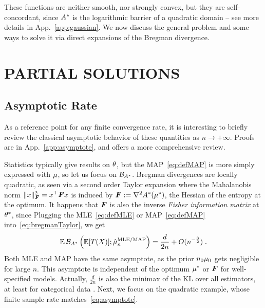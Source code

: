 These functions are neither smooth, nor strongly convex, but they are self-concordant, since ${A^*}$ is  the logarithmic barrier of a quadratic domain
-- see more details in App.~\ref{app:gaussian}.
We now discuss the general problem and some ways to solve it via direct expansions of the Bregman divergence.

\section{PARTIAL SOLUTIONS}
\label{sec:insights}

\subsection{Asymptotic Rate}
\label{ssec:asymptote}
As a reference point for any finite convergence rate, it is interesting to briefly review the classical asymptotic behavior of these quantities as $n \rightarrow +\infty$.
Proofs are in App.~\ref{app:asymptote}, and \citet[\S1.1]{ostrovskii2021finite} offers a more comprehensive review.

Statistics typically give results on $\theta$, but the MAP~\eqref{eq:defMAP} is more simply expressed with $\mu$, so let us focus on ${\mathcal B}_{A^*}$.
Bregman divergences are locally quadratic, as seen via a second order Taylor expansion
where the Mahalanobis norm  $\| x \|_{{\bm{F}}}^2 = x^\top {\bm{F}} x$  is induced by ${\bm{F}}  := \nabla^2{A^*}(\mu^*)$, the Hessian of the entropy at the optimum. It happens that  ${\bm{F}}$ is also the inverse \textit{Fisher information matrix} at $\theta^*$, since
Plugging the MLE~\eqref{eq:defMLE} or MAP~\eqref{eq:defMAP} into~\eqref{eq:bregmanTaylor}, we get
\begin{align}
	\label{eq:asymptote}
	\operatorname{\mathbb{E}} {\mathcal B}_{A^*} \left (\operatorname{\mathbb{E}} [T(X)] ; \hat {\mu}_n^\text{MLE/MAP} \right )
	= \frac{d}{2n} + O(n^{- \frac{3}{2}}) \; .
\end{align}
Both MLE and MAP have the same asymptote, as the prior $n_0 \mu_0$ gets negligible for large $n$.
This asymptote is independent of the optimum $\mu^*$ or ${\bm{F}}$ for well-specified models.
Actually, $\frac{d}{2n}$ is also the minimax of the KL over all estimators, at least for categorical data \citep{braess2004bernstein, kamath2015learning}.
Next, we focus on the quadratic example, whose finite sample rate matches~\eqref{eq:asymptote}.

